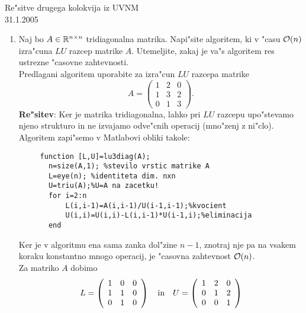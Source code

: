 

\begin{center}
  {\large Re"sitve drugega kolokvija iz UVNM\\
    31.1.2005\\
    }
\end{center}

\begin{enumerate}

  \item Naj bo $A\in\mathbb{R}^{n\times n}$ tridiagonalna matrika. 
    Napi"site algoritem, ki v "casu ${\cal O}(n)$ izra"cuna
    $LU$ razcep matrike $A$. Utemeljite, zakaj je va"s
    algoritem res ustrezne "casovne zahtevnosti.\\
    Predlagani algoritem uporabite za izra"cun $LU$ razcepa matrike
    $$A=\left(
      \begin{array}{ccc}
        1 & 2 & 0\\
        1 & 3 & 2\\
        0 & 1 & 3
      \end{array}
      \right).$$
   {\bf Re"sitev}: Ker je matrika tridiagonalna, lahko pri $LU$
   razcepu upo\-"ste\-va\-mo njeno strukturo in ne izvajamo odve"cnih operacij
   (mno"zenj z ni"clo). Algoritem zapi"semo v Matlabovi obliki takole:
   \begin{verbatim}
     function [L,U]=lu3diag(A);
       n=size(A,1); %stevilo vrstic matrike A
       L=eye(n); %identiteta dim. nxn
       U=triu(A);%U=A na zacetku!
       for i=2:n
           L(i,i-1)=A(i,i-1)/U(i-1,i-1);%kvocient
           U(i,i)=U(i,i)-L(i,i-1)*U(i-1,i);%eliminacija
       end
   \end{verbatim}
   Ker je v algoritmu ena sama zanka dol"zine $n-1$, znotraj nje
   pa na vsakem koraku konstantno mnogo operacij, je "casovna
   zahtevnost ${\cal O}(n)$.\\
   Za matriko $A$ dobimo
   $$L=\left(
         \begin{array}{ccc}
           1 & 0 & 0\\
           1 & 1 & 0\\
           0 & 1 & 0
         \end{array}
      \right) \quad {\rm in} \quad 
      U=\left(
         \begin{array}{ccc}
           1 & 2 & 0\\
           0 & 1 & 2\\
           0 & 0 & 1
         \end{array}
      \right)$$
  

\end{enumerate}
